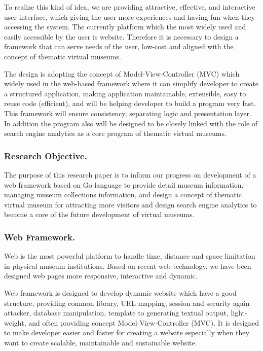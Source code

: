 To realize this kind of idea, we are providing attractive, effective, and interactive user interface, which giving the user more experiences and having fun when they accessing the system. The currently platform which the most widely used and easily accessible by the user is website. Therefore it is necessary to design a framework that can serve needs of the user, low-cost and aligned with the concept of thematic virtual museums.

The design is adopting the concept of Model-View-Controller (MVC) which widely used in the web-based framework where it can simplify developer to create a structured application, making application maintainable, extensible, easy to reuse code (efficient), and will be helping developer to build a program very fast. This framework will ensure consistency, separating logic and presentation layer. In addition the program also will be designed to be closely linked with the role of search engine analytics as a core program of thematic virtual museums.

\subsubsection{Research Objective.} The purpose of this research paper is to inform our progress on development of a web framework based on Go language to provide detail museum information, managing museum collections information, and design a concept of thematic virtual museum for attracting more visitors and design search engine analytics to become a core of the future development of virtual museums.

\subsubsection{Web Framework.} Web is the most powerful platform to handle time, distance and space limitation in physical museum institutions. Based on recent web technology, we have been designed web pages more responsive, interactive and dynamic.

Web framework is designed to develop dynamic website which have a good structure, providing common library, URL mapping, session and security again attacker, database manipulation, template to generating textual output, light- weight, and often providing concept Model-View-Controller (MVC). It is designed to make developer easier and faster for creating a website especially when they want to create scalable, maintainable and sustainable website.

